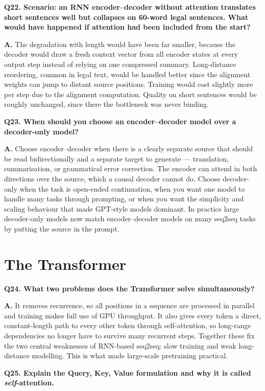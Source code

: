 \documentclass[11pt]{article}
\begin{document}
\medskip
\noindent\textbf{Q22. Scenario: an RNN encoder--decoder without attention translates short sentences well but collapses on 60-word legal sentences. What would have happened if attention had been included from the start?}

\noindent\textbf{A.} The degradation with length would have been far smaller, because the decoder would draw a fresh context vector from all encoder states at every output step instead of relying on one compressed summary. Long-distance reordering, common in legal text, would be handled better since the alignment weights can jump to distant source positions. Training would cost slightly more per step due to the alignment computation. Quality on short sentences would be roughly unchanged, since there the bottleneck was never binding.

\medskip
\noindent\textbf{Q23. When should you choose an encoder--decoder model over a decoder-only model?}

\noindent\textbf{A.} Choose encoder--decoder when there is a clearly separate source that should be read bidirectionally and a separate target to generate --- translation, summarisation, or grammatical error correction. The encoder can attend in both directions over the source, which a causal decoder cannot do. Choose decoder-only when the task is open-ended continuation, when you want one model to handle many tasks through prompting, or when you want the simplicity and scaling behaviour that made GPT-style models dominant. In practice large decoder-only models now match encoder--decoder models on many seq2seq tasks by putting the source in the prompt.

\section{The Transformer}

\noindent\textbf{Q24. What two problems does the Transformer solve simultaneously?}

\noindent\textbf{A.} It removes recurrence, so all positions in a sequence are processed in parallel and training makes full use of GPU throughput. It also gives every token a direct, constant-length path to every other token through self-attention, so long-range dependencies no longer have to survive many recurrent steps. Together these fix the two central weaknesses of RNN-based seq2seq: slow training and weak long-distance modelling. This is what made large-scale pretraining practical.

\medskip
\noindent\textbf{Q25. Explain the Query, Key, Value formulation and why it is called \emph{self}-attention.}
\end{document}
